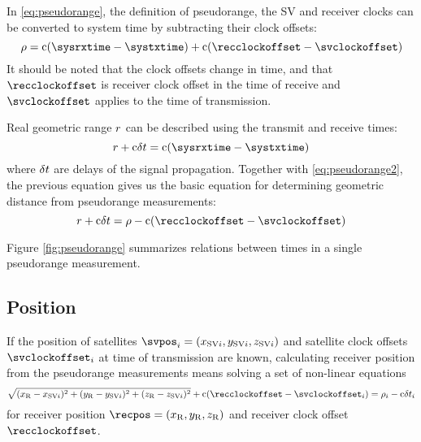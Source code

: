 In \eqref{eq:pseudorange}, the definition of pseudorange, the SV and receiver clocks can be
converted to system time by subtracting their clock offsets:
\begin{equation}
	\label{eq:pseudorange2}
	\rho = \speedoflight (\sysrxtime - \systxtime) + \speedoflight (\recclockoffset - \svclockoffset)
\end{equation}
It should be noted that the clock offsets change in time, and that \(\recclockoffset\) is receiver clock
offset in the time of receive and \(\svclockoffset\) applies to the time of transmission.

Real geometric range \(r\) can be described using the transmit and receive times:
\begin{equation}
	\geomrange + \speedoflight\geomrangedelays = \speedoflight (\sysrxtime - \systxtime)
\end{equation}
where \(\delta{t}\) are delays of the signal propagation.
Together with \eqref{eq:pseudorange2}, the previous equation gives us
the basic equation for determining geometric distance from pseudorange measurements:
\begin{equation}
	\geomrange + \speedoflight\geomrangedelays = \rho - \speedoflight (\recclockoffset - \svclockoffset)
\end{equation}


Figure \ref{fig:pseudorange} summarizes relations between times in a single pseudorange measurement.

\subsection{Position}
\label{sec:gps-position}

If the position of satellites \(\svpos_i = \coord{x_{{\SV}i}}{y_{{\SV}i}}{z_{{\SV}i}}\) and satellite
clock offsets \(\svclockoffset_i\) at time of transmission are known,
calculating receiver position from the pseudorange measurements means solving a set of non-linear equations
\begin{equation}
	\label{eq:pseudorange3}
	\sqrt{(x_\REC - x_{{\SV}i})^2 + (y_\REC - y_{{\SV}i})^2 +(z_\REC - z_{{\SV}i})^2} +
	\speedoflight (\recclockoffset - \svclockoffset_i)
	=
	\rho_i - \speedoflight\geomrangedelays_i
\end{equation}
for receiver position \(\recpos = \coord{x_\REC}{y_\REC}{z_\REC}\) and receiver clock offset \(\recclockoffset\).

